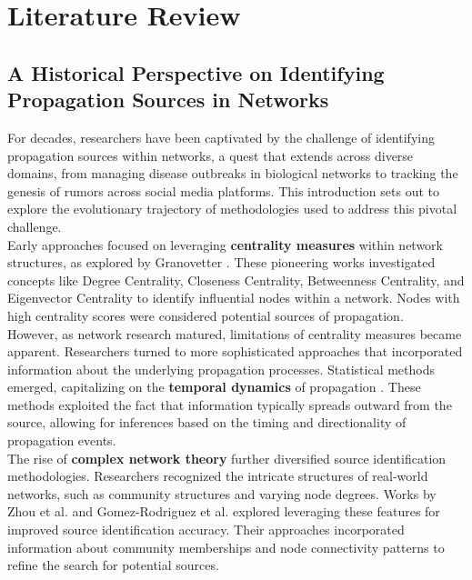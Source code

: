 \chapter{Literature Review}

\section{A Historical Perspective on Identifying Propagation Sources in Networks}
For decades, researchers have been captivated by the challenge of identifying propagation sources within networks, a quest that extends across diverse domains, from managing disease outbreaks in biological networks to tracking the genesis of rumors across social media platforms. This introduction sets out to explore the evolutionary trajectory of methodologies used to address this pivotal challenge.\\

Early approaches focused on leveraging \textbf{centrality measures} within network structures, as explored by Granovetter \cite{granovetter1973}. These pioneering works investigated concepts like Degree Centrality, Closeness Centrality, Betweenness Centrality, and Eigenvector Centrality to identify influential nodes within a network. Nodes with high centrality scores were considered potential sources of propagation.\\

However, as network research matured, limitations of centrality measures became apparent. Researchers turned to more sophisticated approaches that incorporated information about the underlying propagation processes. Statistical methods emerged, capitalizing on the \textbf{temporal dynamics} of propagation \cite{liu2011, chen2010}. These methods exploited the fact that information typically spreads outward from the source, allowing for inferences based on the timing and directionality of propagation events.\\

The rise of \textbf{complex network theory} further diversified source identification methodologies. Researchers recognized the intricate structures of real-world networks, such as community structures and varying node degrees. Works by Zhou et al. \cite{zhou2008} and Gomez-Rodriguez et al. \cite{gomez2011} explored leveraging these features for improved source identification accuracy. Their approaches incorporated information about community memberships and node connectivity patterns to refine the search for potential sources.\\

